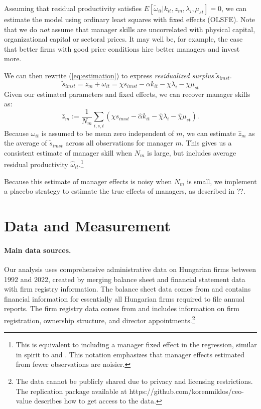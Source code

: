 \documentclass[11pt,a4paper]{article}
\begin{document}
Assuming that residual productivity satisfies $E[\tilde\omega_{it} | k_{it}, z_m, \lambda_i, \mu_{st}]=0$, we can estimate the model using ordinary least squares with fixed effects (OLSFE). Note that we do \emph{not} assume that manager skills are uncorrelated with physical capital, organizational capital or sectoral prices. It may well be, for example, the case that better firms with good price conditions hire better managers and invest more. 

We can then rewrite (\ref{eq:estimation}) to express \textit{residualized surplus} $\tilde{s}_{imst}$.
\begin{equation}\label{eq:rewrite}
 \tilde{s}_{imst} = z_m + \omega_{it}= \chi s_{imst} -  \alpha k_{it}  - \chi \lambda_i -\chi \mu_{st}
\end{equation}
Given our estimated parameters and fixed effects, we can recover manager skills as:
\begin{equation}\label{eq:estimated}
\hat z_m :=
\frac1{N_m}\sum_{i,s,t}(
        \hat\chi s_{imst} -  \hat\alpha k_{it}  -\hat\chi \lambda_i -\hat\chi \mu_{st}
). 
\end{equation}
Because $\omega_{it}$ is assumed to be mean zero independent of $m$, we can estimate $\hat z_m$ as the average of $\tilde s_{imst}$ across all observations for manager $m$. This gives us a consistent estimate of manager skill when $N_m$ is large, but includes average residual productivity $\hat\omega_{it}$.\footnote{This is equivalent to including a manager fixed effect in the regression, similar in spirit to \citet{Abowd1999Econometrica} and \citet{Card2018JoLE}. This notation emphasizes that manager effects estimated from fewer observations are noisier.}

Because this estimate of manager effects is noisy when $N_m$ is small, we implement a placebo strategy to estimate the true effects of managers, as described in ??.

\section{Data and Measurement}
\paragraph{Main data sources.} Our analysis uses comprehensive administrative data on Hungarian firms between 1992 and 2022, created by merging balance sheet and financial statement data with firm registry information. The balance sheet data comes from \citet{merleg2024} and contains financial information for essentially all Hungarian firms required to file annual reports. The firm registry data comes from \citet{cegjegyzek2024} and includes information on firm registration, ownership structure, and director appointments.\footnote{The data cannot be publicly shared due to privacy and licensing restrictions. The replication package available at https://github.com/korenmiklos/ceo-value describes how to get access to the data.}
\end{document}

